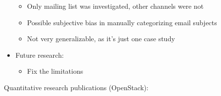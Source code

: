 \documentclass[]{book}
\providecommand{\tightlist}{%
  \setlength{\itemsep}{0pt}\setlength{\parskip}{0pt}}
\begin{document}
\begin{itemize}
  \begin{itemize}
  \tightlist
  \item
    Only mailing list was investigated, other channels were not
  \item
    Possible subjective bias in manually categorizing email subjects
  \item
    Not very generalizable, as it's just one case study
  \end{itemize}
\item
  Future research:

  \begin{itemize}
  \tightlist
  \item
    Fix the limitations
  \end{itemize}
\end{itemize}

Quantitative research publications (OpenStack):
\end{document}
